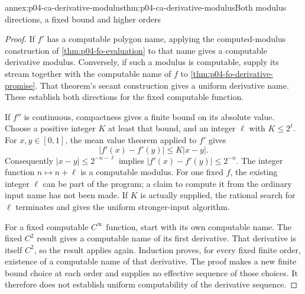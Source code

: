 \begin{annexitem}{annex:p04-ca-derivative-modulus}{thm:p04-ca-derivative-modulus}{Both modulus directions, a fixed bound and higher orders}
\begin{proof}
If \(f'\) has a computable polygon name, applying the computed-modulus
construction of \cref{thm:p04-fo-evaluation} to that name gives a
computable derivative modulus. Conversely, if such a modulus is
computable, supply its stream together with the computable name of
\(f\) to \cref{thm:p04-fo-derivative-promise}.
That theorem's secant construction gives a uniform derivative name.
These establish both directions for the fixed computable function.

If \(f''\) is continuous, compactness gives a finite bound on its
absolute value. Choose a positive integer \(K\) at least that bound,
and an integer \(\ell\) with \(K\leq2^\ell\).
For \(x,y\in[0,1]\), the mean value theorem applied to \(f'\)
gives
\[
 |f'(x)-f'(y)|\leq K|x-y|.
\]
Consequently \(|x-y|\leq2^{-n-\ell}\) implies
\(|f'(x)-f'(y)|\leq2^{-n}\).
The integer function \(n\mapsto n+\ell\) is a computable modulus.
For one fixed \(f\), the existing integer \(\ell\) can be part of
the program; a claim to compute it from the ordinary input name has
not been made. If \(K\) is actually supplied, the rational search for
\(\ell\) terminates and gives the uniform stronger-input algorithm.

For a fixed computable \(C^\infty\) function, start with its own
computable name. The fixed \(C^2\) result gives a computable name of
its first derivative. That derivative is itself \(C^2\), so the
result applies again. Induction proves, for every fixed finite order,
existence of a computable name of that derivative. The proof makes a
new finite bound choice at each order and supplies no effective
sequence of those choices. It therefore does not establish uniform
computability of the derivative sequence.
\end{proof}
\end{annexitem}


